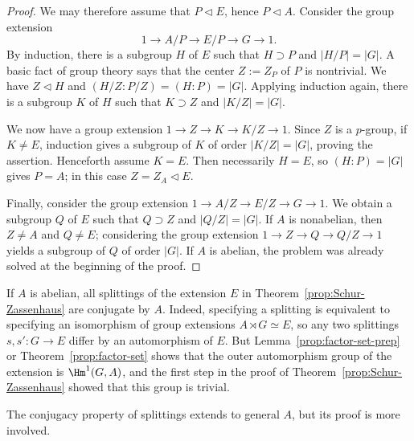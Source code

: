 \begin{proof}
	We may therefore assume that $P\lhd E$, hence $P\lhd A$. Consider the
	group extension
	\[ 1\to A/P\to E/P\to G\to1. \]
	By induction, there is a subgroup $H$ of $E$ such that $H\supset P$ and
	$|H/P|=|G|$. A basic fact of group theory says that the center
	$Z:=Z_P$ of $P$ is nontrivial. We have $Z\lhd H$ and
	$(H/Z:P/Z)=(H:P)=|G|$. Applying induction again, there is a subgroup $K$
	of $H$ such that $K\supset Z$ and $|K/Z|=|G|$.

	We now have a group extension $1\to Z\to K\to K/Z\to1$. Since $Z$ is a
	$p$-group, if $K\neq E$, induction gives a subgroup of $K$ of order
	$|K/Z|=|G|$, proving the assertion. Henceforth assume $K=E$. Then
	necessarily $H=E$, so $(H:P)=|G|$ gives $P=A$; in this case
	$Z=Z_A\lhd E$.

	Finally, consider the group extension
	$1\to A/Z\to E/Z\to G\to1$. We obtain a subgroup $Q$ of $E$ such that
	$Q\supset Z$ and $|Q/Z|=|G|$. If $A$ is nonabelian, then $Z\neq A$ and
	$Q\neq E$; considering the group extension
	$1\to Z\to Q\to Q/Z\to1$ yields a subgroup of $Q$ of order $|G|$. If
	$A$ is abelian, the problem was already solved at the beginning of the
	proof.
\end{proof}

If $A$ is abelian, all splittings of the extension $E$ in
Theorem~\ref{prop:Schur-Zassenhaus} are conjugate by $A$. Indeed, specifying a
splitting is equivalent to specifying an isomorphism of group extensions
$A\rtimes G\simeq E$, so any two splittings $s,s':G\to E$ differ by an
automorphism of $E$. But Lemma~\ref{prop:factor-set-prep} or
Theorem~\ref{prop:factor-set} shows that the outer automorphism group of the
extension is $\Hm^1(G,A)$, and the first step in the proof of
Theorem~\ref{prop:Schur-Zassenhaus} showed that this group is trivial.

The conjugacy property of splittings extends to general $A$, but its proof is
more involved.
